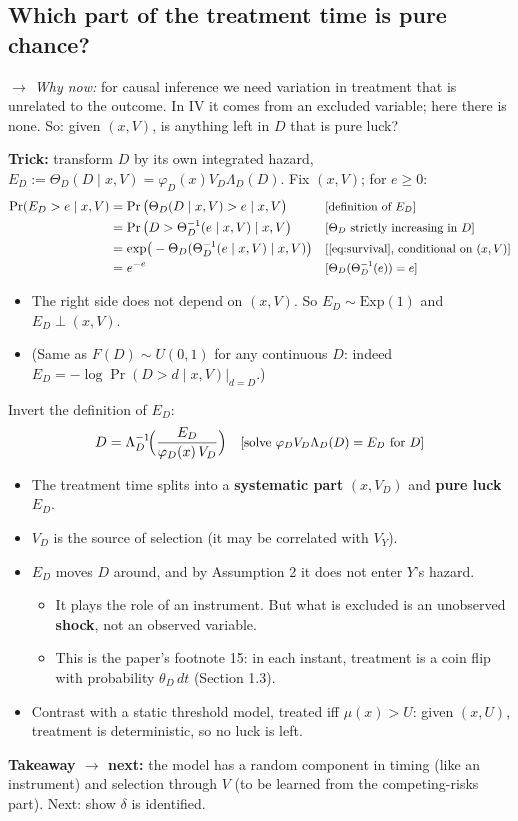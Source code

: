 \documentclass[11pt]{article}
\newcommand{\1}{\mathbf{1}}
\newcommand{\why}[1]{\text{\small[#1]}}
\newcommand{\whynow}[1]{\par\noindent\textit{$\rightarrow$ Why now:} #1\par}
\newcommand{\takeaway}[1]{\par\noindent\textbf{Takeaway $\rightarrow$ next:} #1\par}
\begin{document}
\subsection*{Which part of the treatment time is pure chance?}
\whynow{for causal inference we need variation in treatment that is unrelated to the outcome. In IV it comes from an excluded variable; here there is none. So: given $(x,V)$, is anything left in $D$ that is pure luck?}

\textbf{Trick:} transform $D$ by its own integrated hazard, $E_D := \Theta_D(D\mid x,V) = \varphi_D(x)V_D\Lambda_D(D)$. Fix $(x,V)$; for $e\ge0$:
\begin{align}
  \Pr(E_D>e\mid x,V) &= \Pr\big(\Theta_D(D\mid x,V)>e\mid x,V\big) && \why{definition of $E_D$} \nonumber\\
  &= \Pr\big(D>\Theta_D^{-1}(e\mid x,V)\mid x,V\big) && \why{$\Theta_D$ strictly increasing in $D$} \nonumber\\
  &= \exp\!\big(-\Theta_D(\Theta_D^{-1}(e\mid x,V)\mid x,V)\big) && \why{\eqref{eq:survival}, conditional on $(x,V)$} \nonumber\\
  &= e^{-e} && \why{$\Theta_D(\Theta_D^{-1}(e))=e$} \nonumber
\end{align}
\begin{itemize}
  \item The right side does not depend on $(x,V)$. So $E_D\sim\text{Exp}(1)$ and $E_D\perp(x,V)$.
  \item (Same as $F(D)\sim U(0,1)$ for any continuous $D$: indeed $E_D=-\log\Pr(D>d\mid x,V)\big|_{d=D}$.)
\end{itemize}
Invert the definition of $E_D$:
\begin{align}
  D = \Lambda_D^{-1}\!\Big(\frac{E_D}{\varphi_D(x)\,V_D}\Big) && \why{solve $\varphi_DV_D\Lambda_D(D)=E_D$ for $D$} \nonumber
\end{align}
\begin{itemize}
  \item The treatment time splits into a \textbf{systematic part} $(x,V_D)$ and \textbf{pure luck} $E_D$.
  \item $V_D$ is the source of selection (it may be correlated with $V_Y$).
  \item $E_D$ moves $D$ around, and by Assumption 2 it does not enter $Y$'s hazard.
    \begin{itemize}
      \item It plays the role of an instrument. But what is excluded is an unobserved \textbf{shock}, not an observed variable.
      \item This is the paper's footnote 15: in each instant, treatment is a coin flip with probability $\theta_D\,dt$ (Section 1.3).
    \end{itemize}
  \item Contrast with a static threshold model, treated iff $\mu(x)>U$: given $(x,U)$, treatment is deterministic, so no luck is left.
\end{itemize}
\takeaway{the model has a random component in timing (like an instrument) and selection through $V$ (to be learned from the competing-risks part). Next: show $\delta$ is identified.}
\end{document}
